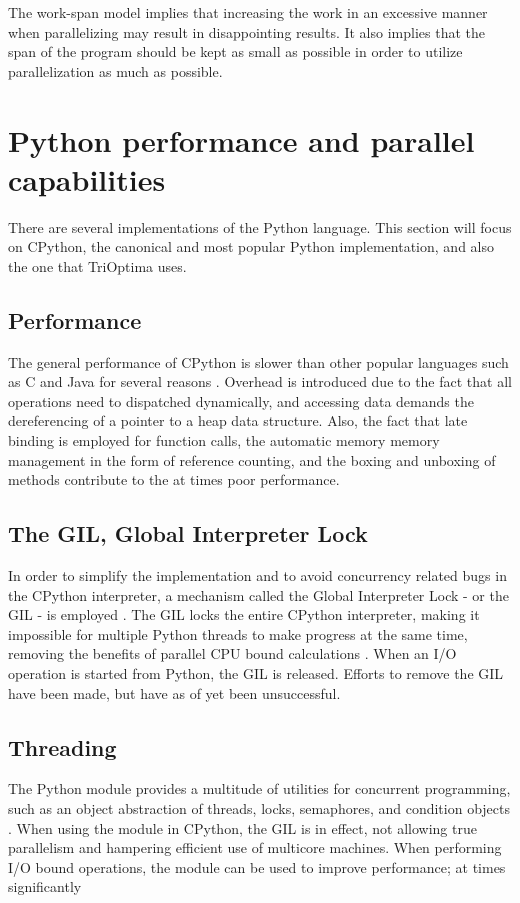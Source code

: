 The work-span model implies that increasing the work in an excessive manner when parallelizing may result in disappointing
results. It also implies that the span of the program should be kept as small as possible in order to utilize parallelization as
much as possible.

\section{Python performance and parallel capabilities}
There are several implementations of the Python language. This section will focus on CPython, the canonical and most popular
Python implementation, and also the one that TriOptima uses.

\subsection{Performance}
The general performance of CPython is slower than other popular languages such as C and Java for several
reasons \cite{barany_2014_python_pipd}. Overhead is introduced due to the fact that all operations need to dispatched dynamically,
and accessing data demands the dereferencing of a pointer to a heap data structure. Also, the fact that late binding is employed
for function calls, the automatic memory memory management in the form of reference counting, and the boxing and unboxing of
methods contribute to the at times poor performance.

\subsection{The GIL, Global Interpreter Lock}
In order to simplify the implementation and to avoid concurrency related bugs in the CPython interpreter,
a mechanism called the Global Interpreter Lock - or the GIL - is employed  \cite{palach_2014_parallel_ppwp}.
The GIL locks the entire CPython interpreter, making it impossible for multiple Python threads to make progress at
the same time, removing the benefits of parallel CPU bound calculations
\cite{glossary_gp2d}. When an I/O operation is started from Python, the GIL is released.
Efforts to remove the GIL have been made, but have as of yet been unsuccessful.

\subsection{Threading}
The Python  module provides a multitude of utilities for concurrent programming, such as an object abstraction of
threads, locks, semaphores, and condition objects \cite{16_1thtip2d}. When using the  module in CPython, the GIL is in
effect, not allowing true parallelism and hampering efficient use of multicore machines. When performing I/O bound operations, the
 module can be used to improve performance; at times significantly \cite[p. 121-124]{slatkin_2015_effective_ep5swtwbp}

